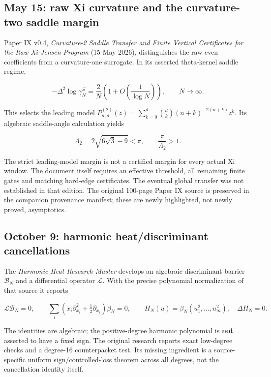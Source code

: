 \documentclass[
  10pt,
  a4paper,
  10pt,
  oneside,
  openany]{book}
\begin{document}
\subsection{May 15: raw Xi curvature and the curvature-two saddle
margin}\label{may-15-raw-xi-curvature-and-the-curvature-two-saddle-margin}

Paper IX v0.4, \emph{Curvature-2 Saddle Transfer and Finite Vertical
Certificates for the Raw Xi-Jensen Program} (15 May 2026), distinguishes
the raw even coefficients from a curvature-one surrogate. In its
asserted theta-kernel saddle regime,

\[
 -\Delta^2\log\gamma_N^\Xi
 =\frac2N\left(1+O\left(\frac1{\log N}\right)\right),\qquad N\to\infty.
 \tag{A29}\label{eq:A29}
\]

This selects the leading model
\(P^{(2)}_{n,d}(z)=\sum_{k=0}^d\binom dk(n+k)^{-2(n+k)}z^k\). Its
algebraic saddle-angle calculation yields

\[
 \Lambda_2=2\sqrt{6\sqrt3-9}<\pi,\qquad
 \frac\pi{\Lambda_2}>1.
 \tag{A30}\label{eq:A30}
\]

The strict leading-model margin is not a certified margin for every
actual Xi window. The document itself requires an effective threshold,
all remaining finite gates and matching hard-edge certificates. The
eventual global transfer was not established in that edition. The
original 100-page Paper IX source is preserved in the companion
provenance manifest; these are newly highlighted, not newly proved,
asymptotics.

\subsection{October 9: harmonic heat/discriminant
cancellations}\label{october-9-harmonic-heatdiscriminant-cancellations}

The \emph{Harmonic Heat Research Master} develops an algebraic
discriminant barrier \(\mathcal B_N\) and a differential operator
\(\mathcal L\). With the precise polynomial normalization of that source
it reports

\[
 \mathcal L\mathcal B_N=0,\qquad
 \sum_i\left(x_i\partial_{x_i}^2+\tfrac12\partial_{x_i}\right)\beta_N=0,
 \qquad H_N(u)=\beta_N(u_1^2,\ldots,u_m^2),\quad \Delta H_N=0.
 \tag{A31}\label{eq:A31}
\]

The identities are algebraic; the positive-degree harmonic polynomial is
\textbf{not} asserted to have a fixed sign. The original research
reports exact low-degree checks and a degree-16 counterpacket test. Its
missing ingredient is a source-specific uniform sign/controlled-loss
theorem across all degrees, not the cancellation identity itself.
\end{document}

